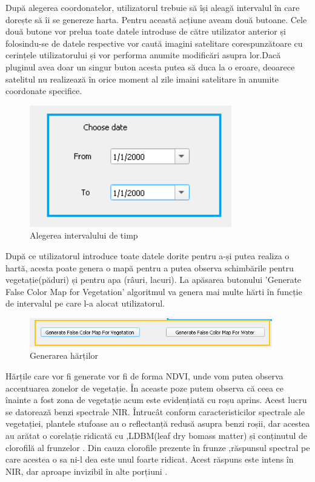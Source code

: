 \documentclass[12pt,a4paper]{article}
\theoremstyle{definition}
\theoremstyle{remark}
\begin{document}
După alegerea coordonatelor, utilizatorul trebuie să își aleagă intervalul în care dorește să îi se genereze harta. Pentru această acțiune aveam două butoane. Cele două butone vor prelua toate datele introduse de către utilizator anterior și folosindu-se de datele respective vor caută imagini satelitare corespunzătoare cu cerințele utilizatorului și vor performa anumite modificări asupra lor.Dacă pluginul avea doar un singur buton acesta putea să duca la o eroare, deoarece satelitul nu realizează în orice moment al zile imaini satelitare în anumite coordonate specifice. 


\begin{figure}[H]
  \centering
  \includegraphics[width=250pt]{date.PNG}
  \caption{Alegerea intervalului de timp}   
\end{figure}

După ce utilizatorul introduce toate datele dorite pentru a-și putea realiza o hartă, acesta poate genera o mapă pentru a putea observa schimbările pentru vegetație(păduri) și pentru apa (râuri, lacuri). La apăsarea butonului 'Generate False Color Map for Vegetation' algoritmul va genera mai multe hărti în funcție de intervalul pe care l-a alocat utilizatorul.

\begin{figure}[H]
  \centering
  \includegraphics[width=300pt]{butoanenoi.PNG}
  \caption{Generarea hărților}   
\end{figure}



Hărțile  care vor fi generate vor fi de forma NDVI, unde vom putea observa accentuarea zonelor de vegetație.
În aceaste poze putem observa că ceea ce înainte a fost zona de vegetație acum este evidențiată cu roșu aprins. Acest lucru se datorează benzi spectrale NIR. Întrucât conform caracteristicilor spectrale ale vegetației, plantele stufoase au o reflectanță redusă asupra benzi roșii, dar acestea au arătat o corelație ridicată cu ,LDBM(leaf dry bomass matter) și conținutul de clorofilă al frunzelor \cite{leaf2}. Din cauza clorofile prezente în frunze ,răspunsul spectral pe care acestea o sa ni-l dea  este unul foarte ridicat. Acest răspuns este intens în NIR, dar aproape invizibil în alte porțiuni \cite{leaf}.
\end{document}
